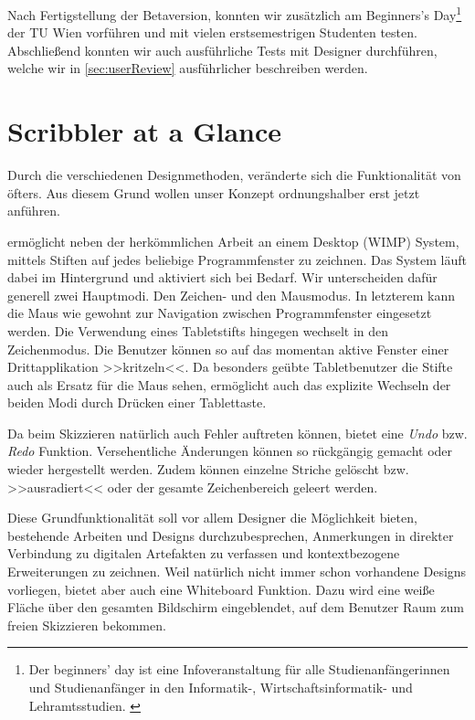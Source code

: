 \medskip Nach Fertigstellung der Betaversion, konnten wir \scribbler zusätzlich am Beginners's Day\footnote{Der beginners' day ist eine Infoveranstaltung für alle Studienanfängerinnen und Studienanfänger in den Informatik-, Wirtschaftsinformatik- und Lehramtsstudien. \citep{TU:2010}} der TU Wien vorführen und mit vielen erstsemestrigen Studenten testen. Abschließend konnten wir auch ausführliche Tests mit Designer durchführen, welche wir in \autoref{sec:userReview} ausführlicher beschreiben werden.

\section{Scribbler at a Glance}
Durch die verschiedenen Designmethoden, veränderte sich die Funktionalität von \scribbler öfters. Aus diesem Grund wollen unser Konzept  ordnungshalber erst jetzt anführen.

\medskip \scribbler ermöglicht neben der herkömmlichen Arbeit an einem Desktop (\acs{WIMP}) System, mittels Stiften auf jedes beliebige Programmfenster zu zeichnen. Das System läuft dabei im Hintergrund und aktiviert sich bei Bedarf. Wir unterscheiden dafür generell zwei Hauptmodi. Den Zeichen- und den Mausmodus. In letzterem kann die Maus wie gewohnt zur Navigation zwischen Programmfenster eingesetzt werden. Die Verwendung eines Tabletstifts hingegen wechselt in den Zeichenmodus. Die Benutzer können so auf das momentan aktive Fenster einer Drittapplikation >>kritzeln<<. Da besonders geübte Tabletbenutzer die Stifte auch als Ersatz für die Maus sehen, ermöglicht \scribbler auch das explizite Wechseln der beiden Modi durch Drücken einer Tablettaste.

\medskip Da beim Skizzieren natürlich auch Fehler auftreten können, bietet \scribbler eine \emph{Undo} bzw. \emph{Redo} Funktion. Versehentliche Änderungen können so rückgängig gemacht oder wieder hergestellt werden. Zudem können einzelne Striche gelöscht bzw. >>ausradiert<< oder der gesamte Zeichenbereich geleert werden.

\medskip Diese Grundfunktionalität soll vor allem Designer die Möglichkeit bieten, bestehende Arbeiten und Designs durchzubesprechen, Anmerkungen in direkter Verbindung zu digitalen Artefakten zu verfassen und kontextbezogene Erweiterungen zu zeichnen. Weil natürlich nicht immer schon vorhandene Designs vorliegen, bietet \scribbler aber auch eine Whiteboard Funktion. Dazu wird eine weiße Fläche über den gesamten Bildschirm eingeblendet, auf dem Benutzer Raum zum freien Skizzieren bekommen.

